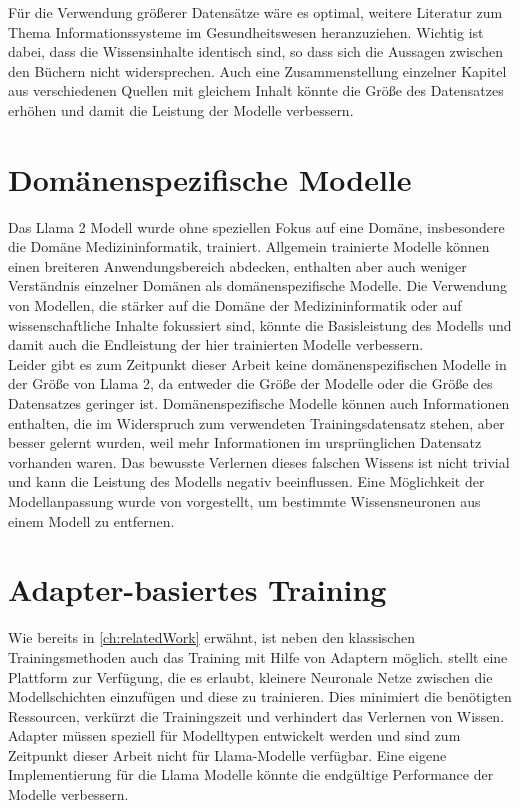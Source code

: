 Für die Verwendung größerer Datensätze wäre es optimal, weitere Literatur zum Thema Informationssysteme im Gesundheitswesen heranzuziehen.
Wichtig ist dabei, dass die Wissensinhalte identisch sind, so dass sich die Aussagen zwischen den Büchern nicht widersprechen.
Auch eine Zusammenstellung einzelner Kapitel aus verschiedenen Quellen mit gleichem Inhalt könnte die Größe des Datensatzes erhöhen und damit die Leistung der Modelle verbessern.\\

\section{Domänenspezifische Modelle}
Das Llama 2 Modell wurde ohne speziellen Fokus auf eine Domäne, insbesondere die Domäne Medizininformatik, trainiert.
Allgemein trainierte Modelle können einen breiteren Anwendungsbereich abdecken, enthalten aber auch weniger Verständnis einzelner Domänen als domänenspezifische Modelle.
Die Verwendung von Modellen, die stärker auf die Domäne der Medizininformatik oder auf wissenschaftliche Inhalte fokussiert sind, könnte die Basisleistung des Modells und damit auch die Endleistung der hier trainierten Modelle verbessern.\\

Leider gibt es zum Zeitpunkt dieser Arbeit keine domänenspezifischen Modelle in der Größe von Llama 2, da entweder die Größe der Modelle oder die Größe des Datensatzes geringer ist.
Domänenspezifische Modelle können auch Informationen enthalten, die im Widerspruch zum verwendeten Trainingsdatensatz stehen, aber besser gelernt wurden, weil mehr Informationen im ursprünglichen Datensatz vorhanden waren.
Das bewusste Verlernen dieses falschen Wissens ist nicht trivial und kann die Leistung des Modells negativ beeinflussen.
Eine Möglichkeit der Modellanpassung wurde von \citet{knowledge_neurons} vorgestellt, um bestimmte Wissensneuronen aus einem Modell zu entfernen.

\section{Adapter-basiertes Training}\label{sec:adapter-training}
Wie bereits in \cref{ch:relatedWork} erwähnt, ist neben den klassischen Trainingsmethoden auch das Training mit Hilfe von Adaptern möglich.
\citet{adapterhub} stellt eine Plattform zur Verfügung, die es erlaubt, kleinere Neuronale Netze zwischen die Modellschichten einzufügen und diese zu trainieren.
Dies minimiert die benötigten Ressourcen, verkürzt die Trainingszeit und verhindert das Verlernen von Wissen.
Adapter müssen speziell für Modelltypen entwickelt werden und sind zum Zeitpunkt dieser Arbeit nicht für Llama-Modelle verfügbar.
Eine eigene Implementierung für die Llama Modelle könnte die endgültige Performance der Modelle verbessern.

